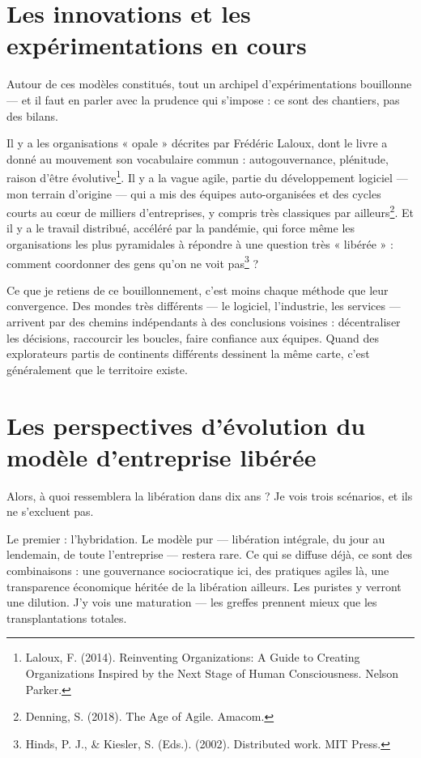 \section{Les innovations et les expérimentations en cours}

Autour de ces modèles constitués, tout un archipel d'expérimentations bouillonne — et il faut en parler avec la prudence qui s'impose : ce sont des chantiers, pas des bilans.

Il y a les organisations « opale » décrites par Frédéric Laloux, dont le livre a donné au mouvement son vocabulaire commun : autogouvernance, plénitude, raison d'être évolutive\footnote{Laloux, F. (2014). Reinventing Organizations: A Guide to Creating Organizations Inspired by the Next Stage of Human Consciousness. Nelson Parker.}. Il y a la vague agile, partie du développement logiciel — mon terrain d'origine — qui a mis des équipes auto-organisées et des cycles courts au cœur de milliers d'entreprises, y compris très classiques par ailleurs\footnote{Denning, S. (2018). The Age of Agile. Amacom.}. Et il y a le travail distribué, accéléré par la pandémie, qui force même les organisations les plus pyramidales à répondre à une question très « libérée » : comment coordonner des gens qu'on ne voit pas\footnote{Hinds, P. J., \& Kiesler, S. (Eds.). (2002). Distributed work. MIT Press.} ?

Ce que je retiens de ce bouillonnement, c'est moins chaque méthode que leur convergence. Des mondes très différents — le logiciel, l'industrie, les services — arrivent par des chemins indépendants à des conclusions voisines : décentraliser les décisions, raccourcir les boucles, faire confiance aux équipes. Quand des explorateurs partis de continents différents dessinent la même carte, c'est généralement que le territoire existe.

\section{Les perspectives d'évolution du modèle d'entreprise libérée}

Alors, à quoi ressemblera la libération dans dix ans ? Je vois trois scénarios, et ils ne s'excluent pas.

Le premier : l'hybridation. Le modèle pur — libération intégrale, du jour au lendemain, de toute l'entreprise — restera rare. Ce qui se diffuse déjà, ce sont des combinaisons : une gouvernance sociocratique ici, des pratiques agiles là, une transparence économique héritée de la libération ailleurs. Les puristes y verront une dilution. J'y vois une maturation — les greffes prennent mieux que les transplantations totales.

